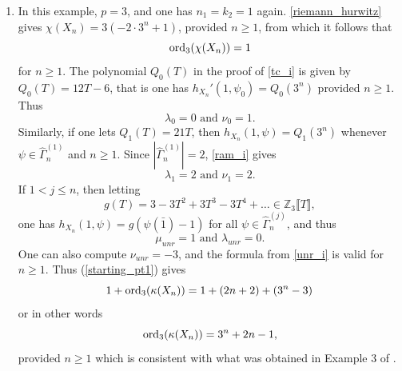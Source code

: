 \documentclass[11pt]{amsart}
\numberwithin{equation}{section}
\theoremstyle{remark}
\theoremstyle{definition}
\begin{document}
\begin{enumerate}
$$\mu_{unr} = \lambda_{unr} = 0. $$ 
One can also compute $\nu_{unr} = 0$ and the formula from \cref{unr_i} is valid for $n \ge 1$.  Thus (\ref{starting_pt1}) gives
$$1 + {\rm ord}_{3}(\kappa(X_{n})) = 2n $$
or in other words
$${\rm ord}_{3}(\kappa(X_{n})) = 2n - 1, $$
provided $n \ge 1$ which is consistent with what was obtained in Example $2$ of \cite[\S 6]{Gambheera/Vallieres:2024}.
\item In this example, $p=3$, and one has $n_{1} = k_{2} = 1$ again.  \cref{riemann_hurwitz} gives $\chi(X_{n}) = 3(-2 \cdot 3^{n} +1)$, provided $n \ge 1$, from which it follows that 
$${\rm ord}_{3}(\chi(X_{n})) = 1$$ 
for $n \ge 1$.  The polynomial $Q_{0}(T)$ in the proof of \cref{tc_i} is given by $Q_{0}(T) = 12T - 6$, that is one has $h_{X_{n}}'(1,\psi_{0}) = Q_{0}(3^{n})$ provided $n \ge 1$.  Thus
$$\lambda_{0} = 0 \text{ and } \nu_{0} = 1. $$ 
Similarly, if one lets $Q_{1}(T) = 21T$, then $h_{X_{n}}(1,\psi) = Q_{1}(3^{n})$ whenever $\psi \in \widehat{\Gamma}_{n}^{(1)}$ and $n \ge 1$.  Since $|\widehat{\Gamma}_{n}^{(1)}| = 2$, \cref{ram_i} gives
$$\lambda_{1} = 2 \text{ and } \nu_{1} = 2. $$
If $1< j \le n$, then letting 
$$g(T) = 3 - 3T^{2} + 3T^{3} - 3T^{4} + \ldots \in \mathbb{Z}_{3}\llbracket T \rrbracket, $$
one has $h_{X_{n}}(1,\psi) = g(\psi(\bar{1}) - 1)$ for all $\psi \in \widehat{\Gamma}_{n}^{(j)}$, and thus
$$\mu_{unr} = 1 \text{ and } \lambda_{unr} = 0. $$ 
One can also compute $\nu_{unr} = -3$, and the formula from \cref{unr_i} is valid for $n \ge 1$.  Thus (\ref{starting_pt1}) gives
$$1 + {\rm ord}_{3}(\kappa(X_{n})) = 1 + (2n + 2) + (3^{n} - 3) $$
or in other words
$${\rm ord}_{3}(\kappa(X_{n})) = 3^{n} + 2n -1, $$
provided $n \ge 1$ which is consistent with what was obtained in Example $3$ of \cite[\S 6]{Gambheera/Vallieres:2024}.
\end{enumerate}
\end{document}
